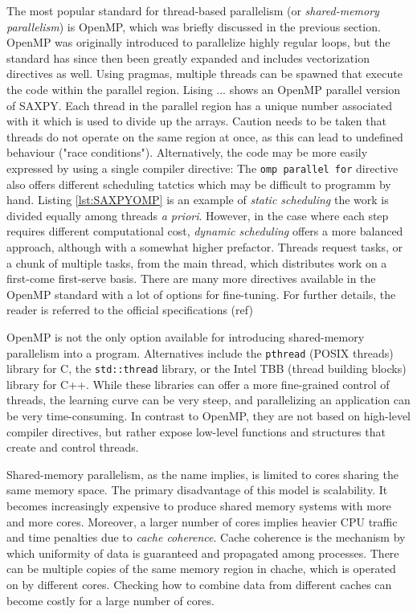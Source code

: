 The most popular standard for thread-based parallelism (or \emph{shared-memory parallelism}) is OpenMP, which was briefly discussed in the previous section. OpenMP was originally introduced to parallelize highly regular loops, but the standard has since then been greatly expanded and includes vectorization directives as well. Using pragmas, multiple threads can be spawned that execute the code within the parallel region. Lising ... shows an OpenMP parallel version of SAXPY. Each thread in the parallel region has a unique number associated with it which is used to divide up the arrays. Caution needs to be taken that threads do not operate on the same region at once, as this can lead to undefined behaviour ("race conditions").  
\noindent Alternatively, the code may be more easily expressed by using a single compiler directive:
\noindent The \texttt{omp parallel for} directive also offers different scheduling tatctics which may be difficult to programm by hand. Listing \ref{lst:SAXPYOMP} is an example of \emph{static scheduling} the work is divided equally among threads \emph{a priori}. However, in the case where each step requires different computational cost, \emph{dynamic scheduling} offers a more balanced approach, although with a somewhat higher prefactor. Threads request tasks, or a chunk of multiple tasks, from the main thread, which distributes work on a first-come first-serve basis. There are many more directives available in the OpenMP standard with a lot of options for fine-tuning. For further details, the reader is referred to the official specifications (ref)

OpenMP is not the only option available for introducing shared-memory parallelism into a program. Alternatives include the \texttt{pthread} (POSIX threads) library for C, the \texttt{std::thread} library, or the Intel TBB (thread building blocks) library for C++. While these libraries can offer a more fine-grained control of threads, the learning curve can be very steep, and parallelizing an application can be very time-consuming. In contrast to OpenMP, they are not based on high-level compiler directives, but rather expose low-level functions and structures that create and control threads. 

Shared-memory parallelism, as the name implies, is limited to cores sharing the same memory space. The primary disadvantage of this model is scalability. It becomes increasingly expensive to produce shared memory systems with more and more cores. Moreover, a larger number of cores implies heavier CPU traffic and time penalties due to \emph{cache coherence}. Cache coherence is the mechanism by which uniformity of data is guaranteed and propagated among processes. There can be multiple copies of the same memory region in chache, which is operated on by different cores. Checking how to combine data from different caches can become costly for a large number of cores.

